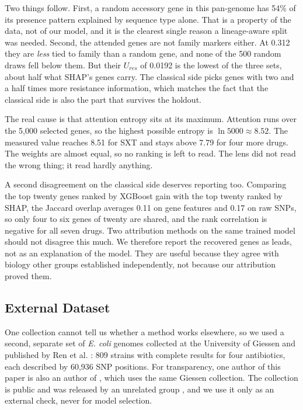 \documentclass[conference]{IEEEtran}
\begin{document}
Two things follow. First, a random accessory gene in this pan-genome has 54\% of its
presence pattern explained by sequence type alone. That is a property of the data,
not of our model, and it is the clearest single reason a lineage-aware split was
needed. Second, the attended genes are not family markers either. At 0.312 they are
\textit{less} tied to family than a random gene, and none of the 500 random draws
fell below them. But their $U_{res}$ of 0.0192 is the lowest of the three sets,
about half what SHAP's genes carry. The classical side picks genes with two and a
half times more resistance information, which matches the fact that the classical
side is also the part that survives the holdout.

The real cause is that attention entropy sits at its maximum. Attention runs over
the 5{,}000 selected genes, so the highest possible entropy is
$\ln 5000 \approx 8.52$. The measured value reaches 8.51 for SXT and stays above
7.79 for four more drugs. The weights are almost equal, so no ranking is left to
read. The lens did not read the wrong thing; it read hardly anything.

A second disagreement on the classical side deserves reporting too. Comparing the
top twenty genes ranked by XGBoost gain with the top twenty ranked by SHAP, the
Jaccard overlap averages 0.11 on gene features and 0.17 on raw SNPs, so only four to
six genes of twenty are shared, and the rank correlation is negative for all seven
drugs. Two attribution methods on the same trained model should not disagree this
much. We therefore report the recovered genes as leads, not as an explanation of the
model. They are useful because they agree with biology other groups established
independently, not because our attribution proved them.

\subsection{External Dataset}

One collection cannot tell us whether a method works elsewhere, so we used a second,
separate set of \textit{E. coli} genomes collected at the University of Giessen and published by Ren et al. \cite{ren2022}: 809 strains with complete results for four
antibiotics, each described by 60{,}936 SNP positions. For transparency, one author
of this paper is also an author of \cite{siddiqui2025}, which uses the same Giessen
collection. The collection is public and was released by an unrelated group
\cite{ren2022}, and we use it only as an external check, never for model selection.
\end{document}
